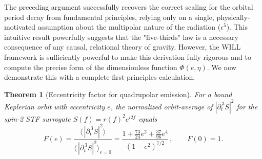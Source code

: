 \documentclass[12pt, a4paper]{article}
\newtheorem{theorem}{Theorem}[section]
\begin{document}
The preceding argument successfully recovers the correct scaling for the orbital period decay from fundamental principles, relying only on a single, physically-motivated assumption about the multipolar nature of the radiation ($\epsilon^5$). This intuitive result powerfully suggests that the "five-thirds" law is a necessary consequence of any causal, relational theory of gravity. However, the WILL framework is sufficiently powerful to make this derivation fully rigorous and to compute the precise form of the dimensionless function $\Phi(e,\eta)$. We now demonstrate this with a complete first-principles calculation.

\begin{theorem}[Eccentricity factor for quadrupolar emission]\label{thm:Fe}
For a bound Keplerian orbit with eccentricity $e$, the normalized orbit-average
of $|\partial_t^{\,3} S|^2$ for the spin-2 STF surrogate $S(f)=r(f)^2 e^{i2f}$ equals
\[
F(e)=\frac{\big\langle\,|\partial_t^{\,3} S|^2\big\rangle}
{\big\langle\,|\partial_t^{\,3} S|^2\big\rangle_{e=0}}
=\frac{1+\frac{73}{24}e^2+\frac{37}{96}e^4}{(1-e^2)^{7/2}}\,,
\qquad F(0)=1.
\]
\end{theorem}
\end{document}
